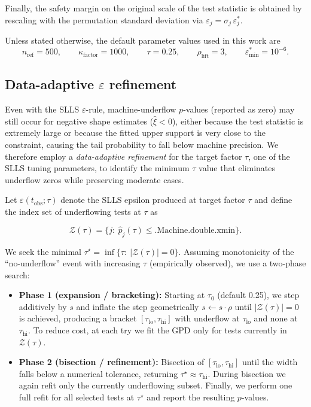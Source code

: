 Finally, the safety margin on the original scale of the test statistic is obtained by rescaling with the permutation standard deviation via $\varepsilon_j=\sigma_j\,\varepsilon_j^\ast$.

Unless stated otherwise, the default parameter values used in this work are
\[
n_{\mathrm{ref}}=500,
\qquad
\kappa_{\mathrm{factor}}=1000,
\qquad
\tau=0.25,
\qquad
\rho_{\mathrm{lift}}=3,
\qquad
\varepsilon_{\min}^{\ast}=10^{-6}.
\]

\subsection{Data-adaptive \texorpdfstring{$\varepsilon$}{epsilon} refinement}
\label{sec:6perm:epsilon:refinement}

Even with the SLLS $\varepsilon$-rule, machine-underflow $p$-values (reported as zero) may still occur for negative shape estimates ($\hat\xi < 0$), either because the test statistic is extremely large or because the fitted upper support is very close to the constraint, causing the tail probability to fall below machine precision. We therefore employ a \textit{data-adaptive refinement} for the target factor $\tau$, one of the SLLS tuning parameters, to identify the minimum $\tau$ value that eliminates underflow zeros while preserving moderate cases.

Let $\varepsilon(t_{\text{obs}};\tau)$ denote the SLLS epsilon produced at target factor $\tau$ and define the index set of underflowing tests at $\tau$ as

\begin{equation}
 \mathcal Z(\tau)=\{j:\ \hat p_j(\tau)\leq \text{.Machine.double.xmin}\}.
\end{equation}

We seek the minimal $\tau^\star=\inf \{\tau:\ |\mathcal Z(\tau)|=0\}$.
Assuming monotonicity of the “no-underflow” event with increasing $\tau$ (empirically observed), we use a two-phase search:

\begin{itemize}
    \item \textbf{Phase 1 (expansion / bracketing):} Starting at $\tau_0$ (default 0.25), we step additively by $s$ and inflate the step geometrically $s\leftarrow s\cdot\rho$ until $|\mathcal Z(\tau)|=0$ is achieved, producing a bracket $[\tau_{\text{lo}},\tau_{\text{hi}}]$ with underflow at $\tau_{\text{lo}}$ and none at $\tau_{\text{hi}}$. To reduce cost, at each try we fit the GPD only for tests currently in $\mathcal Z(\tau)$.

    \item \textbf{Phase 2 (bisection / refinement):} Bisection of $[\tau_{\text{lo}},\tau_{\text{hi}}]$ until the width falls below a numerical tolerance, returning $\tau^\star\approx\tau_{\text{hi}}$. During bisection we again refit only the currently underflowing subset. Finally, we perform one full refit for all selected tests at $\tau^\star$ and report the resulting $p$-values.
\end{itemize}

